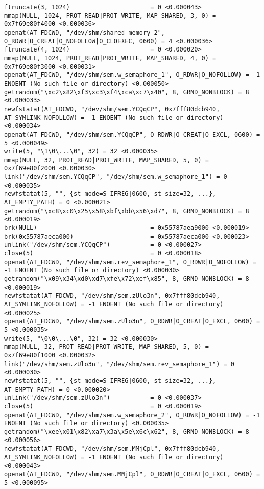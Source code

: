 \documentclass[a4paper, 12pt]{article}
\begin{document}
\begin{lstlisting}
ftruncate(3, 1024)                      = 0 <0.000043>
mmap(NULL, 1024, PROT_READ|PROT_WRITE, MAP_SHARED, 3, 0) = 0x7f69e80f4000 <0.000036>
openat(AT_FDCWD, "/dev/shm/shared_memory_2", O_RDWR|O_CREAT|O_NOFOLLOW|O_CLOEXEC, 0600) = 4 <0.000036>
ftruncate(4, 1024)                      = 0 <0.000020>
mmap(NULL, 1024, PROT_READ|PROT_WRITE, MAP_SHARED, 4, 0) = 0x7f69e80f3000 <0.000031>
openat(AT_FDCWD, "/dev/shm/sem.w_semaphore_1", O_RDWR|O_NOFOLLOW) = -1 ENOENT (No such file or directory) <0.000050>
getrandom("\xc2\x82\xf3\xc3\xf4\xca\xc7\x40", 8, GRND_NONBLOCK) = 8 <0.000033>
newfstatat(AT_FDCWD, "/dev/shm/sem.YCQqCP", 0x7fff80dcb940, AT_SYMLINK_NOFOLLOW) = -1 ENOENT (No such file or directory) <0.000034>
openat(AT_FDCWD, "/dev/shm/sem.YCQqCP", O_RDWR|O_CREAT|O_EXCL, 0600) = 5 <0.000049>
write(5, "\1\0\...\0", 32) = 32 <0.000035>
mmap(NULL, 32, PROT_READ|PROT_WRITE, MAP_SHARED, 5, 0) = 0x7f69e80f2000 <0.000030>
link("/dev/shm/sem.YCQqCP", "/dev/shm/sem.w_semaphore_1") = 0 <0.000035>
newfstatat(5, "", {st_mode=S_IFREG|0600, st_size=32, ...}, AT_EMPTY_PATH) = 0 <0.000021>
getrandom("\xc8\xc0\x25\x58\xbf\xbb\x56\xd7", 8, GRND_NONBLOCK) = 8 <0.000019>
brk(NULL)                               = 0x55787aea9000 <0.000019>
brk(0x55787aeca000)                     = 0x55787aeca000 <0.000023>
unlink("/dev/shm/sem.YCQqCP")           = 0 <0.000027>
close(5)                                = 0 <0.000018>
openat(AT_FDCWD, "/dev/shm/sem.rev_semaphore_1", O_RDWR|O_NOFOLLOW) = -1 ENOENT (No such file or directory) <0.000030>
getrandom("\x09\x34\xd0\xd7\xfe\x72\xef\x85", 8, GRND_NONBLOCK) = 8 <0.000019>
newfstatat(AT_FDCWD, "/dev/shm/sem.zUlo3n", 0x7fff80dcb940, AT_SYMLINK_NOFOLLOW) = -1 ENOENT (No such file or directory) <0.000025>
openat(AT_FDCWD, "/dev/shm/sem.zUlo3n", O_RDWR|O_CREAT|O_EXCL, 0600) = 5 <0.000035>
write(5, "\0\0\...\0", 32) = 32 <0.000030>
mmap(NULL, 32, PROT_READ|PROT_WRITE, MAP_SHARED, 5, 0) = 0x7f69e80f1000 <0.000032>
link("/dev/shm/sem.zUlo3n", "/dev/shm/sem.rev_semaphore_1") = 0 <0.000030>
newfstatat(5, "", {st_mode=S_IFREG|0600, st_size=32, ...}, AT_EMPTY_PATH) = 0 <0.000020>
unlink("/dev/shm/sem.zUlo3n")           = 0 <0.000037>
close(5)                                = 0 <0.000019>
openat(AT_FDCWD, "/dev/shm/sem.w_semaphore_2", O_RDWR|O_NOFOLLOW) = -1 ENOENT (No such file or directory) <0.000035>
getrandom("\xee\x01\x82\xa7\x3a\x5e\x6c\x62", 8, GRND_NONBLOCK) = 8 <0.000056>
newfstatat(AT_FDCWD, "/dev/shm/sem.MMjCpl", 0x7fff80dcb940, AT_SYMLINK_NOFOLLOW) = -1 ENOENT (No such file or directory) <0.000043>
openat(AT_FDCWD, "/dev/shm/sem.MMjCpl", O_RDWR|O_CREAT|O_EXCL, 0600) = 5 <0.000095>

\end{lstlisting}
\end{document}
